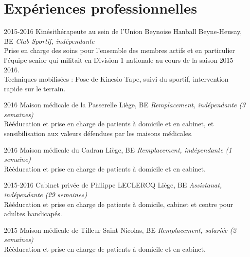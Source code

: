 \documentclass[]{cv-lea}
\begin{document}
\section{Expériences professionnelles}

\begin{entrylist}
\entry
{2015-2016}
{Kinésithérapeute au sein de l'Union Beynoise Hanball}
{Beyne-Heusay, BE}
{\emph{Club Sportif, indépendante}\\
Prise en charge des soins pour l'ensemble des membres actifs et en particulier l'équipe senior qui militait en Division 1 nationale au cours de la saison 2015-2016.\\
Techniques mobilisées : Pose de Kinesio Tape, suivi du sportif, intervention rapide sur le terrain.
}
\end{entrylist}
\begin{entrylist}
\entry
{2016}
{Maison médicale de la Passerelle}
{Liège, BE}
{\emph{Remplacement, indépendante (3 semaines)}\\
Rééducation et prise en charge de patients à domicile et en cabinet, et
sensibilisation aux valeurs défendues par les maisons médicales.
}
\end{entrylist}
\begin{entrylist}
\entry
{2016}
{Maison médicale du Cadran}
{Liège, BE}
{\emph{Remplacement, indépendante (1 semaine)}\\
Rééducation et prise en charge de patients à domicile et en cabinet.
}
\end{entrylist}
\begin{entrylist}
\entry
{2015-2016}
{Cabinet privée de Philippe LECLERCQ}
{Liège, BE}
{\emph{Assistanat, indépendante (29 semaines)}\\
Rééducation et prise en charge de patients à domicile, cabinet et centre pour adultes handicapés.
}
\end{entrylist}
\begin{entrylist}
\entry
{2015}
{Maison médicale de Tilleur}
{Saint Nicolas, BE}
{\emph{Remplacement, salariée (2 semaines)}\\
Rééducation et prise en charge de patients à domicile et en cabinet.
}
\end{entrylist}
\end{document}
